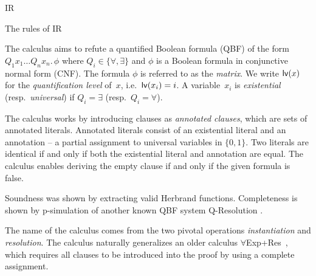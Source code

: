 \begin{entry}{IR}
\begin{calculus}
    \centerline{The rules of IR~\cite{MFCS14}}
\end{calculus}


\begin{clarifications}
  The calculus aims to refute a quantified Boolean formula (QBF) of the form
  $Q_1 x_1\dots Q_n x_n.\,\phi$ where $Q_i\in\{\forall,\exists\}$
  and $\phi$ is a Boolean formula in conjunctive normal form (CNF).
  The formula $\phi$ is referred to as the \emph{matrix}.
  We write ${\sf lv}(x)$ for the \emph{quantification level} of~$x$, i.e.\ ${\sf lv}(x_i)=i$.
  A variable~$x_i$ is \emph{existential} (resp.\ \emph{universal}) if $Q_i=\exists$ (resp.\ $Q_i=\forall$).

  The calculus works by introducing clauses as \emph{annotated clauses}, which are sets of annotated literals. Annotated literals consist of an existential literal and an annotation -- a partial assignment to universal variables in $\{0,1\}$. Two literals are identical if and only if both the existential literal and annotation are equal.
%
  The calculus enables deriving the empty clause if and only if the given formula is false.
\end{clarifications}


\begin{technicalities}
Soundness was shown by extracting valid Herbrand functions. Completeness is shown by p-simulation of 
another known QBF system Q-Resolution .
\end{technicalities}


\begin{history}
The name of the calculus comes from the two pivotal operations \emph{instantiation} and \emph{resolution}.
The calculus naturally generalizes an older calculus $\forall$Exp+Res~\cite{JanotaTCS15},
which  requires all clauses to be introduced into the proof by using a complete assignment.
\end{history}


\end{entry}
